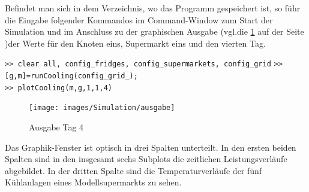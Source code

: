 Befindet man sich in dem Verzeichnis, wo das Programm gespeichert ist, so f\"uhr
die Eingabe folgender Kommandos im \matlab Command-Window zum Start der
Simulation und im Anschluss zu der graphischen Ausgabe (vgl.die \cref{fig:ausg}
auf der Seite \pageref{fig:ausg})der Werte f\"ur den Knoten eins, Supermarkt
eins und den vierten Tag.

\noindent \lstinline{>> clear all, config_fridges, config_supermarkets, config_grid}
\noindent \lstinline{>> [g,m]=runCooling(config_grid_);}\\
\noindent \lstinline{>> plotCooling(m,g,1,1,4)}\\
\begin{figure}[h]
\begin{center}
\texttt{[image: images/Simulation/ausgabe]}
\end{center}
\caption{Ausgabe Tag 4}
\label{fig:ausg}
\end{figure}
Das Graphik-Fenster ist optisch in drei Spalten unterteilt. In den ersten beiden
Spalten sind in den insgesamt sechs Subplots die zeitlichen Leistungsverl\"aufe
abgebildet. In der dritten Spalte sind die Temperaturverl\"aufe der f\"unf
K\"uhlanlagen eines Modellsupermarkts zu sehen.
